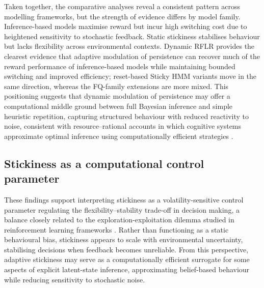\documentclass[11pt, reprint, aps, prl]{revtex4-2}
\begin{document}
Taken together, the comparative analyses reveal a consistent pattern across modelling frameworks, but the strength of evidence differs by model family. Inference-based models maximise reward but incur high switching cost due to heightened sensitivity to stochastic feedback. Static stickiness stabilises behaviour but lacks flexibility across environmental contexts. Dynamic RFLR provides the clearest evidence that adaptive modulation of persistence can recover much of the reward performance of inference-based models while maintaining bounded switching and improved efficiency; reset-based Sticky HMM variants move in the same direction, whereas the FQ-family extensions are more mixed. This positioning suggests that dynamic modulation of persistence may offer a computational middle ground between full Bayesian inference and simple heuristic repetition, capturing structured behaviour with reduced reactivity to noise, consistent with resource--rational accounts in which cognitive systems approximate optimal inference using computationally efficient strategies \cite{Griffiths2015}. 

\subsection{Stickiness as a computational control parameter}
These findings support interpreting stickiness as a volatility-sensitive control parameter regulating the flexibility--stability trade-off in decision making, a balance closely related to the exploration-exploitation dilemma studied in reinforcement learning frameworks \cite{Daw2006}. Rather than functioning as a static behavioural bias, stickiness appears to scale with environmental uncertainty, stabilising decisions when feedback becomes unreliable. From this perspective, adaptive stickiness may serve as a computationally efficient surrogate for some aspects of explicit latent-state inference, approximating belief-based behaviour while reducing sensitivity to stochastic noise.
\end{document}
